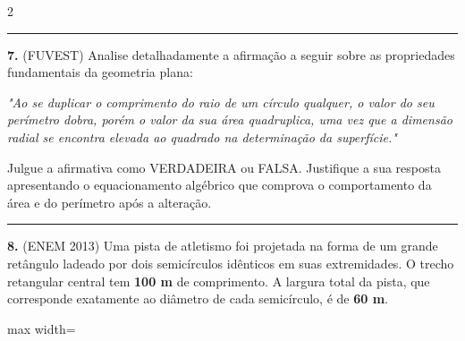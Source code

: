 \documentclass[11pt, a4paper]{article}
\begin{document}
\begin{multicols*}{2}
\vspace{0.4cm}
\noindent\textcolor{CorLinha}{\rule{\linewidth}{0.5pt}} 
\vspace{0.2cm}

\textbf{7.} (FUVEST) Analise detalhadamente a afirmação a seguir sobre as propriedades fundamentais da geometria plana:

\textit{"Ao se duplicar o comprimento do raio de um círculo qualquer, o valor do seu perímetro dobra, porém o valor da sua área quadruplica, uma vez que a dimensão radial se encontra elevada ao quadrado na determinação da superfície."}

Julgue a afirmativa como VERDADEIRA ou FALSA. Justifique a sua resposta apresentando o equacionamento algébrico que comprova o comportamento da área e do perímetro após a alteração.

\vspace{2.5cm}

\vspace{0.4cm}
\noindent\textcolor{CorLinha}{\rule{\linewidth}{0.5pt}} 
\vspace{0.2cm}

\textbf{8.} (ENEM 2013) Uma pista de atletismo foi projetada na forma de um grande retângulo ladeado por dois semicírculos idênticos em suas extremidades. O trecho retangular central tem \textbf{100 m} de comprimento. A largura total da pista, que corresponde exatamente ao diâmetro de cada semicírculo, é de \textbf{60 m}.

\begin{center}
\begin{adjustbox}{max width=\linewidth}
\end{adjustbox}
\end{center}
\end{multicols*}
\end{document}
